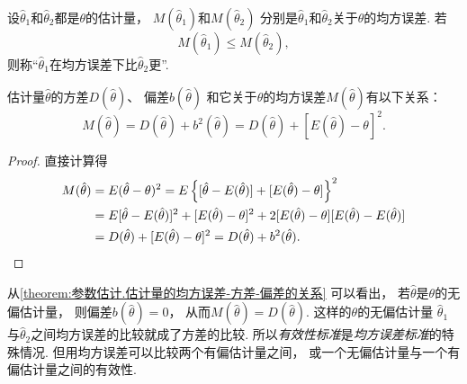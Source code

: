 \begin{definition}
设\(\hat{\theta}_1\)和\(\hat{\theta}_2\)都是\(\theta\)的估计量，
\(M(\hat{\theta}_1)\)和\(M(\hat{\theta}_2)\)
分别是\(\hat{\theta}_1\)和\(\hat{\theta}_2\)关于\(\theta\)的均方误差.
若\[
	M(\hat{\theta}_1) \leq M(\hat{\theta}_2),
\]
则称“\(\hat{\theta}_1\)在均方误差下比\(\hat{\theta}_2\)更”.
\end{definition}

\begin{theorem}\label{theorem:参数估计.估计量的均方误差-方差-偏差的关系}
估计量\(\hat{\theta}\)的方差\(D(\hat{\theta})\)、
偏差\(b(\hat{\theta})\)
和它关于\(\theta\)的均方误差\(M(\hat{\theta})\)有以下关系：
\begin{equation}
	M(\hat{\theta}) = D(\hat{\theta}) + b^2(\hat{\theta})
	= D(\hat{\theta}) + [E(\hat{\theta}) - \theta]^2.
\end{equation}
\begin{proof}
直接计算得\begin{align*}
	M(\hat{\theta})
	&= E(\hat{\theta} - \theta)^2
	= E\left\{
		[\hat{\theta} - E(\hat{\theta})]
		+ [E(\hat{\theta}) - \theta]
	\right\}^2 \\
	&= E[\hat{\theta} - E(\hat{\theta})]^2
	+ [E(\hat{\theta}) - \theta]^2
	+ 2[E(\hat{\theta}) - \theta][E(\hat{\theta}) - E(\hat{\theta})] \\
	&= D(\hat{\theta}) + [E(\hat{\theta}) - \theta]^2
	= D(\hat{\theta}) + b^2(\hat{\theta}).
	\qedhere
\end{align*}
\end{proof}
\end{theorem}
从\cref{theorem:参数估计.估计量的均方误差-方差-偏差的关系} 可以看出，
若\(\hat{\theta}\)是\(\theta\)的无偏估计量，
则偏差\(b(\hat{\theta})=0\)，
从而\(M(\hat{\theta})=D(\hat{\theta})\).
这样的\(\theta\)的无偏估计量
\(\hat{\theta}_1\)与\(\hat{\theta}_2\)之间均方误差的比较就成了方差的比较.
所以\emph{有效性标准}是\emph{均方误差标准}的特殊情况.
但用均方误差可以比较两个有偏估计量之间，
或一个无偏估计量与一个有偏估计量之间的有效性.

